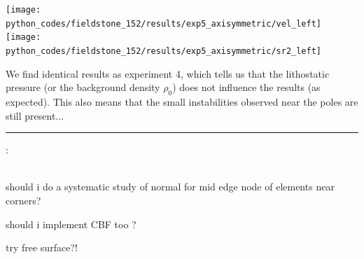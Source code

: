 \begin{center}
\texttt{[image: python\_codes/fieldstone\_152/results/exp5\_axisymmetric/vel\_left]}
\texttt{[image: python\_codes/fieldstone\_152/results/exp5\_axisymmetric/sr2\_left]}
\end{center}

We find identical results as experiment 4, which tells us that the lithostatic pressure 
(or the background density $\rho_0$) does not influence the results (as expected).
This also means that the small instabilities observed near the poles are still present...





\newpage
\par\noindent\rule{\textwidth}{0.4pt}


\vspace{.5cm}

\noindent\Literature:\\
\\

should i do a systematic study of normal for mid edge node of elements near corners?

should i implement CBF too ?

try free surface?!
